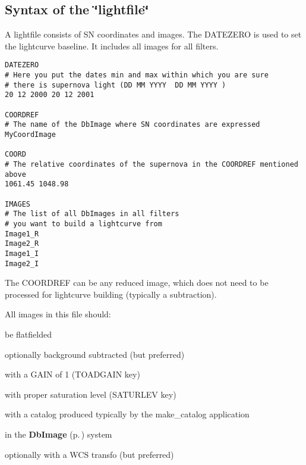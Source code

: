 \subsection{Syntax of the \char`\"{}lightfile\char`\"{}}\label{lightfile}
 A lightfile consists of SN coordinates and images. The DATEZERO is used to set the lightcurve baseline. It includes all images for all filters.

\footnotesize\begin{verbatim}DATEZERO
# Here you put the dates min and max within which you are sure
# there is supernova light (DD MM YYYY  DD MM YYYY )
20 12 2000 20 12 2001

COORDREF
# The name of the DbImage where SN coordinates are expressed
MyCoordImage

COORD
# The relative coordinates of the supernova in the COORDREF mentioned above
1061.45 1048.98

IMAGES
# The list of all DbImages in all filters
# you want to build a lightcurve from
Image1_R
Image2_R
Image1_I
Image2_I\end{verbatim}\normalsize 


The COORDREF can be any reduced image, which does not need to be processed for lightcurve building (typically a subtraction).

All images in this file should:  \begin{CompactItemize}
\item 
 be flatfielded \item 
 optionally background subtracted (but preferred) \item 
 with a GAIN of 1 (TOADGAIN key) \item 
 with proper saturation level (SATURLEV key) \item 
 with a catalog produced typically by the make\_\-catalog application \item 
 in the {\bf Db\-Image} {\rm (p.\,\pageref{class_dbimage})} system \item 
 optionally with a WCS transfo (but preferred)\end{CompactItemize}
